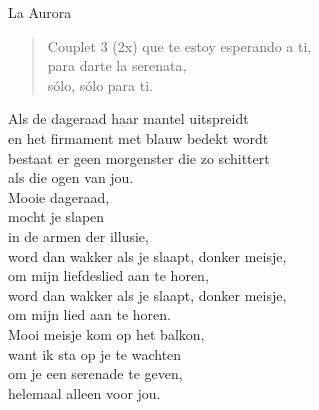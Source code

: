 \begin{song}[vals]{La Aurora}
\begin{verse}{Couplet 3 (2x)}
que te estoy esperando a ti,\\
para darte la serenata,\\
sólo, sólo para ti. \hspace{1em}\hspace{2em}\\
\end{verse}
\begin{translation}
Als de dageraad haar mantel uitspreidt\\
en het firmament met blauw bedekt wordt\\
bestaat er geen morgenster die zo schittert\\
als die ogen van jou.\\\vspace{1em}
Mooie dageraad,\\
mocht je slapen\\
in de armen der illusie,\\
word dan wakker als je slaapt, donker meisje,\\
om mijn liefdeslied aan te horen,\\
word dan wakker als je slaapt, donker meisje,\\
om mijn lied aan te horen.\\\vspace{1em}
Mooi meisje kom op het balkon,\\
want ik sta op je te wachten\\
om je een serenade te geven,\\
helemaal alleen voor jou.\\
\end{translation}
\end{song}
